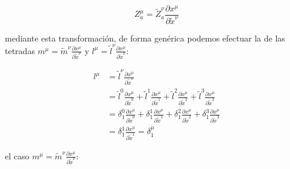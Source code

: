 \begin{enumerate}[1.]
          \begin{equation}
              Z_a^\mu = \tilde{Z}_a^\nu \frac{\partial x^\mu}{\partial \tilde{x}^\nu}
          \end{equation}

          mediante esta transformación, de forma genérica podemos efectuar la de las tetradas $m^\mu = \tilde{m}^\nu \frac{\partial x^\mu}{\partial \tilde{x}^\nu}$ y $l^\mu = \tilde{l}^\nu \frac{\partial x^\mu}{\partial \tilde{x}^\nu}$:

          \begin{equation}
              \begin{aligned}
                  l^\mu & = \tilde{l}^\nu \frac{\partial x^\mu}{\partial \tilde{x}^\nu}                                                                                                                                                                           \\
                        & = \tilde{l}^0 \frac{\partial x^\mu}{\partial \tilde{x}^0} + \tilde{l}^1 \frac{\partial x^\mu}{\partial \tilde{x}^1} + \tilde{l}^2 \frac{\partial x^\mu}{\partial \tilde{x}^2} + \tilde{l}^3 \frac{\partial x^\mu}{\partial \tilde{x}^3} \\
                        & = \delta_1^0 \frac{\partial x^\mu}{\partial \tilde{x}^0} + \delta_1^1 \frac{\partial x^\mu}{\partial \tilde{x}^1} + \delta_1^2 \frac{\partial x^\mu}{\partial \tilde{x}^2} + \delta_1^3 \frac{\partial x^\mu}{\partial \tilde{x}^3}     \\
                        & = \delta_1^1 \frac{\partial x^\mu}{\partial \tilde{x}^1} = \delta_1^\mu
              \end{aligned}
          \end{equation}

          el caso $m^\mu = \tilde{m}^\nu \frac{\partial x^\mu}{\partial \tilde{x}^\nu}$:


\end{enumerate}
